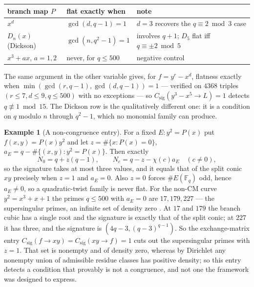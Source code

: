 \documentclass[11pt]{article}
\theoremstyle{definition}
\newtheorem{example}[definition]{Example}
\theoremstyle{plain}
\theoremstyle{remark}
\newcommand{\F}{\mathbb F}
\newcommand{\csig}{C_{\mathrm{sig}}}
\begin{document}
\begin{center}
\begin{tabular}{@{}lll@{}}
\toprule
branch map \(P\) & flat exactly when & note\\
\midrule
\(x^d\) & \(\gcd(d,q-1)=1\) & \(d=3\) recovers the \(q\equiv2\bmod3\) case\\
\(D_n(x)\) (Dickson) & \(\gcd(n,q^2-1)=1\) & involves \(q+1\); \(D_5\) flat iff \(q\equiv\pm2\bmod5\)\\
\(x^3+ax\), \(a=1,2\) & never, for \(q\le500\) & negative control\\
\bottomrule
\end{tabular}
\end{center}

The same argument in the other variable gives, for \(f=y^r-x^d\), flatness
exactly when \(\min(\gcd(r,q-1),\gcd(d,q-1))=1\) --- verified on \(4368\)
triples \((r\le7,d\le9,q\le500)\) with no exceptions --- so
\(\csig(y^3-x^5\to L)=1\) detects \(q\not\equiv1\bmod{15}\).  The Dickson row is
the qualitatively different one: it is a condition on \(q\) modulo \(n\) through
\(q^2-1\), which no monomial family can produce.

\begin{example}[A non-congruence entry]
\label{ex:supersingular}
For a fixed \(E:y^2=P(x)\) put \(f(x,y)=P(x)y^2\) and let
\(z=\#\{x:P(x)=0\}\), \(a_E=q-\#\{(x,y):y^2=P(x)\}\).  Then exactly
\[
  N_0=q+z(q-1),
  \qquad
  N_c=q-z-\chi(c)a_E\quad(c\ne0),
\]
so the signature takes at most three values, and it equals that of the split
conic \(xy\) precisely when \(z=1\) and \(a_E=0\).  Also \(z=0\) forces \(\#E(\F_q)\) odd, hence \(a_E\ne0\), so a quadratic-twist
family is never flat.  For the non-CM curve \(y^2=x^3+x+1\) the primes
\(q\le500\) with \(a_E=0\) are \(17,179,227\) --- the supersingular primes,
an infinite \cite{elkies-supersingular} set of density zero
\cite{serre-chebotarev}.  At \(17\) and \(179\) the branch cubic has a single
root and the signature is exactly that of the split conic; at \(227\) it has
three, and the signature is \((4q-3,(q-3)^{q-1})\).  So the exchange-matrix
entry \(\csig(f\to xy)=\csig(xy\to f)=1\) cuts out the supersingular primes
with \(z=1\).  That set is nonempty and of density zero, whereas by Dirichlet
any nonempty union of admissible residue classes has positive density; so this
entry detects a condition that provably is not a congruence, and not one the
framework was designed to express.
\end{example}
\end{document}
